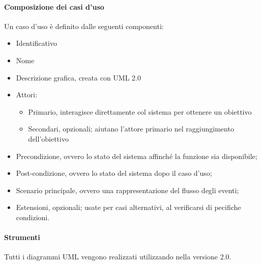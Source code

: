 \paragraph{Composizione dei casi d'uso} \hfill \break
Un caso d'uso è definito dalle seguenti componenti: 
\begin{itemize}
  \item Identificativo
  \item Nome
  \item Descrizione grafica, creata con UML 2.0
  \item Attori:
  \begin{itemize}
    \item Primario, interagisce direttamente col sistema per ottenere un obiettivo
    \item Secondari, opzionali; aiutano l'attore primario nel raggiungimento dell'obiettivo
  \end{itemize}
    \item Precondizione, ovvero lo stato del sistema affinché la funzione sia disponibile;
    \item Post-condizione, ovvero lo stato del sistema dopo il caso d'uso;
    \item Scenario principale, ovvero una rappresentazione del flusso degli eventi;
    \item Estensioni, opzionali; usate per casi alternativi, al verificarsi di pecifiche condizioni.
  \end{itemize}
  
\paragraph{Strumenti} \hfill \break
Tutti i diagrammi UML vengono realizzati utilizzando  nella versione 2.0.

